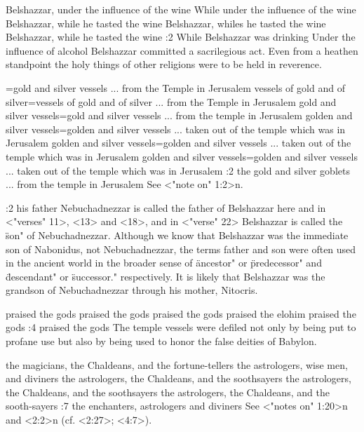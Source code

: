    {Belshazzar, under the influence of the wine} %
    {While under the influence of the wine} %
    {Belshazzar, while he tasted the wine} %
    {Belshazzar, whiles he tasted the wine} %
    {Belshazzar, while he tasted the wine} %
:2 {While Belshazzar was drinking} Under the influence of alcohol  Belshazzar committed a sacrilegious act. Even from a heathen standpoint the holy things of
other religions were to be held  in reverence.

={gold and silver vessels ... from the Temple in Jerusalem} %
    {vessels of gold and of silver}={vessels of gold and of silver ... from the Temple in Jerusalem} %
    {gold and silver vessels}={gold and silver vessels ... from the temple in Jerusalem} %
    {golden and silver vessels}={golden and silver vessels ... taken out of the temple which was in Jerusalem} %
    {golden and silver vessels}={golden and silver vessels ... taken out of the temple which was in Jerusalem} %
    {golden and silver vessels}={golden and silver vessels ... taken out of the temple which was in Jerusalem} %
:2 {the gold and silver goblets ... from the temple in Jerusalem}
See <"note on" 1:2>n.

:2 {his father} %
Nebuchadnezzar is called the father of
Belshazzar here and in <"verses" 11>, <13> and <18>, and in <"verse" 22> Belshazzar is called the
 \"son" of Nebuchadnezzar. Although we know that 
Belshazzar was the immediate son of Nabonidus, not Nebuchadnezzar, the terms father and 
son were often used in the ancient world in the broader sense of 
 \"ancestor" or \"predecessor" and \"descendant" or \"successor." respectively. It is likely that
Belshazzar was the grandson of Nebuchadnezzar through his mother, Nitocris.


    {praised the gods} %
    {praised the gods} %
    {praised the gods} %
    {praised the elohim} %
    {praised the gods} %
:4 {praised the gods} The temple vessels were defiled not only by being put to profane use but also
by being used to honor the false deities of Babylon.

    {the magicians, the Chaldeans, and the fortune-tellers} %
    {the astrologers, wise men, and diviners} %
    {the astrologers, the Chaldeans, and the soothsayers} %
    {the astrologers, the Chaldeans, and the soothsayers} %
    {the astrologers, the Chaldeans, and the sooth-sayers} %
:7 {the enchanters, astrologers and diviners} See <"notes on" 1:20>n and <2:2>n (cf. <2:27>;
<4:7>).

